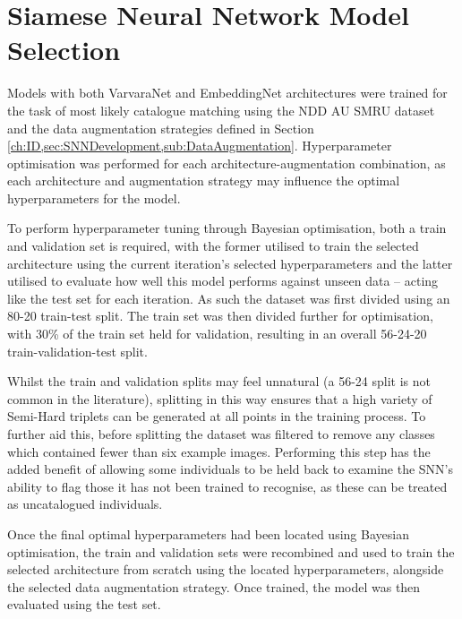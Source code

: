 \section{Siamese Neural Network Model Selection}\label{ch:ID,sec:ModelSelection}

Models with both VarvaraNet and EmbeddingNet architectures were trained for the task of most likely catalogue matching using the NDD AU SMRU dataset and the data augmentation strategies defined in Section \ref{ch:ID,sec:SNNDevelopment,sub:DataAugmentation}. Hyperparameter optimisation was performed for each architecture-augmentation combination, as each architecture and augmentation strategy may influence the optimal hyperparameters for the model.

To perform hyperparameter tuning through Bayesian optimisation, both a train and validation set is required, with the former utilised to train the selected architecture using the current iteration's selected hyperparameters and the latter utilised to evaluate how well this model performs against unseen data -- acting like the test set for each iteration. As such the dataset was first divided using an 80-20 train-test split. The train set was then divided further for optimisation, with 30\% of the train set held for validation, resulting in an overall 56-24-20 train-validation-test split.

Whilst the train and validation splits may feel unnatural (a 56-24 split is not common in the literature), splitting in this way ensures that a high variety of Semi-Hard triplets can be generated at all points in the training process. To further aid this, before splitting the dataset was filtered to remove any classes which contained fewer than six example images. Performing this step has the added benefit of allowing some individuals to be held back to examine the SNN's ability to flag those it has not been trained to recognise, as these can be treated as uncatalogued individuals. 

Once the final optimal hyperparameters had been located using Bayesian optimisation, the train and validation sets were recombined and used to train the selected architecture from scratch using the located hyperparameters, alongside the selected data augmentation strategy. Once trained, the model was then evaluated using the test set. 

